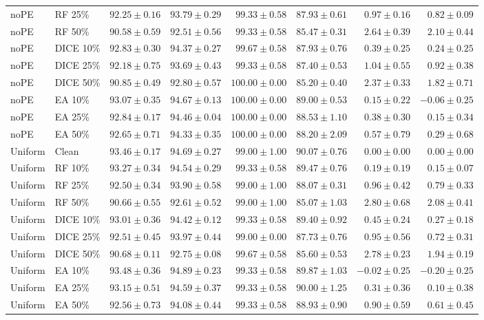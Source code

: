 {\begin{longtable}{llrrrrrr}
noPE & RF 25\% & $92.25\pm0.16$ & $93.79\pm0.29$ & $99.33\pm0.58$ & $87.93\pm0.61$ & $0.97\pm0.16$ & $0.82\pm0.09$ \\
noPE & RF 50\% & $90.58\pm0.59$ & $92.51\pm0.56$ & $99.33\pm0.58$ & $85.47\pm0.31$ & $2.64\pm0.39$ & $2.10\pm0.44$ \\
noPE & DICE 10\% & $92.83\pm0.30$ & $94.37\pm0.27$ & $99.67\pm0.58$ & $87.93\pm0.76$ & $0.39\pm0.25$ & $0.24\pm0.25$ \\
noPE & DICE 25\% & $92.18\pm0.75$ & $93.69\pm0.43$ & $99.33\pm0.58$ & $87.40\pm0.53$ & $1.04\pm0.55$ & $0.92\pm0.38$ \\
noPE & DICE 50\% & $90.85\pm0.49$ & $92.80\pm0.57$ & $100.00\pm0.00$ & $85.20\pm0.40$ & $2.37\pm0.33$ & $1.82\pm0.71$ \\
noPE & EA 10\% & $93.07\pm0.35$ & $94.67\pm0.13$ & $100.00\pm0.00$ & $89.00\pm0.53$ & $0.15\pm0.22$ & $-0.06\pm0.25$ \\
noPE & EA 25\% & $92.84\pm0.17$ & $94.46\pm0.04$ & $100.00\pm0.00$ & $88.53\pm1.10$ & $0.38\pm0.30$ & $0.15\pm0.34$ \\
noPE & EA 50\% & $92.65\pm0.71$ & $94.33\pm0.35$ & $100.00\pm0.00$ & $88.20\pm2.09$ & $0.57\pm0.79$ & $0.29\pm0.68$ \\
Uniform & Clean & $93.46\pm0.17$ & $94.69\pm0.27$ & $99.00\pm1.00$ & $90.07\pm0.76$ & $0.00\pm0.00$ & $0.00\pm0.00$ \\
Uniform & RF 10\% & $93.27\pm0.34$ & $94.54\pm0.29$ & $99.33\pm0.58$ & $89.47\pm0.76$ & $0.19\pm0.19$ & $0.15\pm0.07$ \\
Uniform & RF 25\% & $92.50\pm0.34$ & $93.90\pm0.58$ & $99.00\pm1.00$ & $88.07\pm0.31$ & $0.96\pm0.42$ & $0.79\pm0.33$ \\
Uniform & RF 50\% & $90.66\pm0.55$ & $92.61\pm0.52$ & $99.00\pm1.00$ & $85.07\pm1.03$ & $2.80\pm0.68$ & $2.08\pm0.41$ \\
Uniform & DICE 10\% & $93.01\pm0.36$ & $94.42\pm0.12$ & $99.33\pm0.58$ & $89.40\pm0.92$ & $0.45\pm0.24$ & $0.27\pm0.18$ \\
Uniform & DICE 25\% & $92.51\pm0.45$ & $93.97\pm0.44$ & $99.00\pm0.00$ & $87.73\pm0.76$ & $0.95\pm0.56$ & $0.72\pm0.31$ \\
Uniform & DICE 50\% & $90.68\pm0.11$ & $92.75\pm0.08$ & $99.67\pm0.58$ & $85.60\pm0.53$ & $2.78\pm0.23$ & $1.94\pm0.19$ \\
Uniform & EA 10\% & $93.48\pm0.36$ & $94.89\pm0.23$ & $99.33\pm0.58$ & $89.87\pm1.03$ & $-0.02\pm0.25$ & $-0.20\pm0.25$ \\
Uniform & EA 25\% & $93.15\pm0.51$ & $94.59\pm0.37$ & $99.33\pm0.58$ & $90.00\pm1.25$ & $0.31\pm0.36$ & $0.10\pm0.38$ \\
Uniform & EA 50\% & $92.56\pm0.73$ & $94.08\pm0.44$ & $99.33\pm0.58$ & $88.93\pm0.90$ & $0.90\pm0.59$ & $0.61\pm0.45$ \\
\end{longtable}
}


